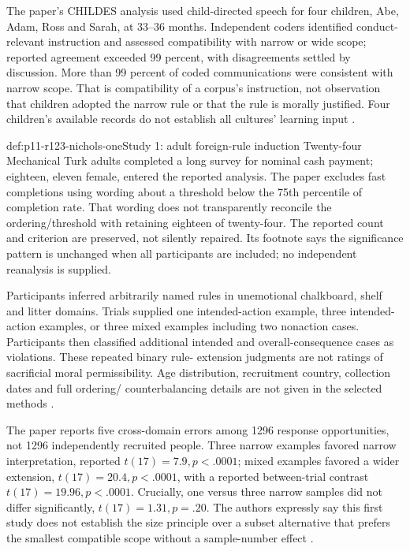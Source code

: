 The paper's CHILDES analysis used child-directed speech for four children,
Abe, Adam, Ross and Sarah, at 33--36 months. Independent coders identified
conduct-relevant instruction and assessed compatibility with narrow or
wide scope; reported agreement exceeded 99 percent, with disagreements
settled by discussion. More than 99 percent of coded communications were
consistent with narrow scope. That is compatibility of a corpus's
instruction, not observation that children adopted the narrow rule or
that the rule is morally justified. Four children's available records
do not establish all cultures' learning input
\parencite[pp.~537--538]{NicholsEtAl2016RulesR123}.

\begin{hbdefinition}{def:p11-r123-nichols-one}{Study 1: adult foreign-rule induction}
Twenty-four Mechanical Turk adults completed a long survey for nominal
cash payment; eighteen, eleven female, entered the reported analysis.
The paper excludes fast completions using wording about a threshold
below the 75th percentile of completion rate. That wording does not
transparently reconcile the ordering/threshold with retaining eighteen
of twenty-four. The reported count and criterion are preserved, not
silently repaired. Its footnote says the significance pattern is unchanged
when all participants are included; no independent reanalysis is supplied.

Participants inferred arbitrarily named rules in unemotional chalkboard,
shelf and litter domains. Trials supplied one intended-action example,
three intended-action examples, or three mixed examples including two
nonaction cases. Participants then classified additional intended and
overall-consequence cases as violations. These repeated binary rule-
extension judgments are not ratings of sacrificial moral permissibility.
Age distribution, recruitment country, collection dates and full ordering/
counterbalancing details are not given in the selected methods
\parencite[pp.~538--539]{NicholsEtAl2016RulesR123}.
\end{hbdefinition}

The paper reports five cross-domain errors among 1296 response opportunities,
not 1296 independently recruited people. Three narrow examples favored
narrow interpretation, reported \(t(17)=7.9,p<.0001\); mixed examples
favored a wider extension, \(t(17)=20.4,p<.0001\), with a reported
between-trial contrast \(t(17)=19.96,p<.0001\). Crucially, one versus
three narrow samples did not differ significantly,
\(t(17)=1.31,p=.20\). The authors expressly say this first study
does not establish the size principle over a subset alternative that
prefers the smallest compatible scope without a sample-number effect
\parencite[pp.~539,542--543]{NicholsEtAl2016RulesR123}.

